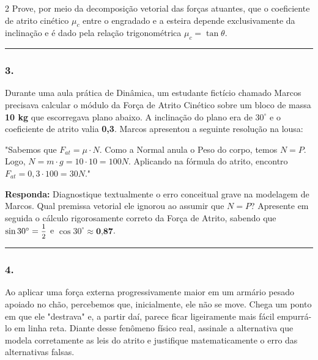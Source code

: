 \documentclass[twoside, 10pt, a4paper]{article}
\newlength{\espacoPreQuestao}\setlength{\espacoPreQuestao}{0.1cm}
\newlength{\espacoQuestao}\setlength{\espacoQuestao}{0.2cm}
\begin{document}
\begin{multicols*}{2}
Prove, por meio da decomposição vetorial das forças atuantes, que o coeficiente de atrito cinético $\mu_c$ entre o engradado e a esteira depende exclusivamente da inclinação e é dado pela relação trigonométrica $\mu_c = \tan \theta$.
\par\vspace{\espacoQuestao}

\noindent\textcolor{CorLinha}{\rule{\linewidth}{0.5pt}}
\par\vspace{\espacoPreQuestao}
\subsubsection*{3.} Durante uma aula prática de Dinâmica, um estudante fictício chamado Marcos precisava calcular o módulo da Força de Atrito Cinético sobre um bloco de massa \textbf{10 kg} que escorregava plano abaixo. A inclinação do plano era de $30^\circ$ e o coeficiente de atrito valia \textbf{0,3}. Marcos apresentou a seguinte resolução na lousa:

"Sabemos que $F_{at} = \mu \cdot N$. Como a Normal anula o Peso do corpo, temos $N = P$. Logo, $N = m \cdot g = 10 \cdot 10 = 100 N$. Aplicando na fórmula do atrito, encontro $F_{at} = 0,3 \cdot 100 = 30 N$."

\begin{boxresponda}
\textbf{Responda:} Diagnostique textualmente o erro conceitual grave na modelagem de Marcos. Qual premissa vetorial ele ignorou ao assumir que $N = P$? Apresente em seguida o cálculo rigorosamente correto da Força de Atrito, sabendo que $\sin 30^\circ = \mfrac{1}{2}$ e $\cos 30^\circ \approx \textbf{0,87}$.
\end{boxresponda}
\par\vspace{\espacoQuestao}

\noindent\textcolor{CorLinha}{\rule{\linewidth}{0.5pt}} 
\par\vspace{\espacoPreQuestao}
\subsubsection*{4.} Ao aplicar uma força externa progressivamente maior em um armário pesado apoiado no chão, percebemos que, inicialmente, ele não se move. Chega um ponto em que ele "destrava" e, a partir daí, parece ficar ligeiramente mais fácil empurrá-lo em linha reta. Diante desse fenômeno físico real, assinale a alternativa que modela corretamente as leis do atrito e justifique matematicamente o erro das alternativas falsas.


\end{multicols*}
\end{document}
